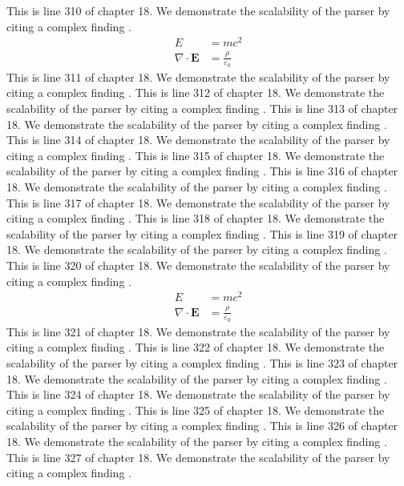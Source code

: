 This is line 310 of chapter 18. We demonstrate the scalability of the parser by citing a complex finding \cite{ref18_310}.
\begin{align*}
  E &= mc^2 \\
  \nabla \cdot \mathbf{E} &= \frac{\rho}{\varepsilon_0}
\end{align*}
This is line 311 of chapter 18. We demonstrate the scalability of the parser by citing a complex finding \cite{ref18_311}.
This is line 312 of chapter 18. We demonstrate the scalability of the parser by citing a complex finding \cite{ref18_312}.
This is line 313 of chapter 18. We demonstrate the scalability of the parser by citing a complex finding \cite{ref18_313}.
This is line 314 of chapter 18. We demonstrate the scalability of the parser by citing a complex finding \cite{ref18_314}.
This is line 315 of chapter 18. We demonstrate the scalability of the parser by citing a complex finding \cite{ref18_315}.
This is line 316 of chapter 18. We demonstrate the scalability of the parser by citing a complex finding \cite{ref18_316}.
This is line 317 of chapter 18. We demonstrate the scalability of the parser by citing a complex finding \cite{ref18_317}.
This is line 318 of chapter 18. We demonstrate the scalability of the parser by citing a complex finding \cite{ref18_318}.
This is line 319 of chapter 18. We demonstrate the scalability of the parser by citing a complex finding \cite{ref18_319}.
This is line 320 of chapter 18. We demonstrate the scalability of the parser by citing a complex finding \cite{ref18_320}.
\begin{align*}
  E &= mc^2 \\
  \nabla \cdot \mathbf{E} &= \frac{\rho}{\varepsilon_0}
\end{align*}
This is line 321 of chapter 18. We demonstrate the scalability of the parser by citing a complex finding \cite{ref18_321}.
This is line 322 of chapter 18. We demonstrate the scalability of the parser by citing a complex finding \cite{ref18_322}.
This is line 323 of chapter 18. We demonstrate the scalability of the parser by citing a complex finding \cite{ref18_323}.
This is line 324 of chapter 18. We demonstrate the scalability of the parser by citing a complex finding \cite{ref18_324}.
This is line 325 of chapter 18. We demonstrate the scalability of the parser by citing a complex finding \cite{ref18_325}.
This is line 326 of chapter 18. We demonstrate the scalability of the parser by citing a complex finding \cite{ref18_326}.
This is line 327 of chapter 18. We demonstrate the scalability of the parser by citing a complex finding \cite{ref18_327}.
